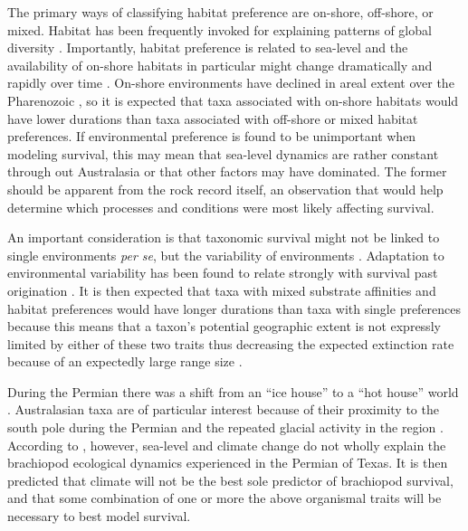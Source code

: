 \documentclass[12pt,letterpaper]{article}
\begin{document}
The primary ways of classifying habitat preference are on-shore, off-shore, or mixed. Habitat has been frequently invoked for explaining patterns of global diversity \citep{Sepkoski1991,Kiessling2007a,Bottjer1988,Jablonski1991,Jablonski1983b}. Importantly, habitat preference is related to sea-level and the availability of on-shore habitats in particular might change dramatically and rapidly over time \citep{Olszewski2004}. On-shore environments have declined in areal extent over the Pharenozoic \citep{Peters2008}, so it is expected that taxa associated with on-shore habitats would have lower durations than taxa associated with off-shore or mixed habitat preferences. If environmental preference is found to be unimportant when modeling survival, this may mean that sea-level dynamics are rather constant through out Australasia or that other factors may have dominated. The former should be apparent from the rock record itself, an observation that would help determine which processes and conditions were most likely affecting survival.

An important consideration is that taxonomic survival might not be linked to single environments \textit{per se}, but the variability of environments \citep{Foote2013,Heim2011,Liow2007b}. Adaptation to environmental variability has been found to relate strongly with survival past origination \citep{Foote2013}. It is then expected that taxa with mixed substrate affinities and habitat preferences would have longer durations than taxa with single preferences because this means that a taxon's potential geographic extent is not expressly limited by either of these two traits thus decreasing the expected extinction rate because of an expectedly large range size \citep{Jablonski1986,Harnik2013,Nurnberg2013a,Jablonski2003,Roy2009c}. 

During the Permian there was a shift from an ``ice house'' to a ``hot house'' world \citep{Fielding2006,Birgenheier2010,Jones2006,Powell2007}. Australasian taxa are of particular interest because of their proximity to the south pole during the Permian and the repeated glacial activity in the region \citep{Fielding2006,Birgenheier2010,Jones2006}. According to \citet{Olszewski2004}, however, sea-level and climate change do not wholly explain the brachiopod ecological dynamics experienced in the Permian of Texas. It is then predicted that climate will not be the best sole predictor of brachiopod survival, and that some combination of one or more the above organismal traits will be necessary to best model survival. 
\end{document}
